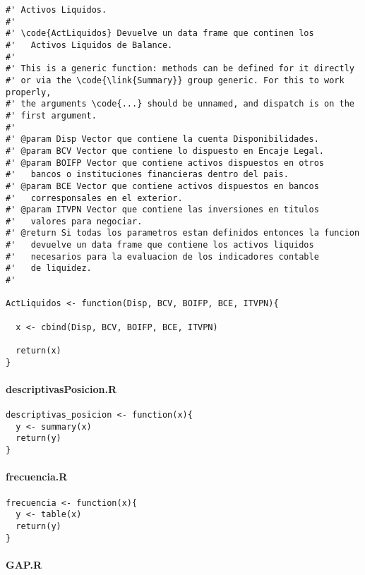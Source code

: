 \documentclass[]{article}
\begin{document}
\begin{verbatim}
#' Activos Liquidos.
#'
#' \code{ActLiquidos} Devuelve un data frame que continen los 
#'   Activos Liquidos de Balance.
#'
#' This is a generic function: methods can be defined for it directly
#' or via the \code{\link{Summary}} group generic. For this to work properly,
#' the arguments \code{...} should be unnamed, and dispatch is on the
#' first argument.
#'
#' @param Disp Vector que contiene la cuenta Disponibilidades.
#' @param BCV Vector que contiene lo dispuesto en Encaje Legal.
#' @param BOIFP Vector que contiene activos dispuestos en otros
#'   bancos o instituciones financieras dentro del pais.
#' @param BCE Vector que contiene activos dispuestos en bancos
#'   corresponsales en el exterior.
#' @param ITVPN Vector que contiene las inversiones en titulos
#'   valores para negociar.
#' @return Si todas los parametros estan definidos entonces la funcion
#'   devuelve un data frame que contiene los activos liquidos 
#'   necesarios para la evaluacion de los indicadores contable 
#'   de liquidez.
#'   

ActLiquidos <- function(Disp, BCV, BOIFP, BCE, ITVPN){
  
  x <- cbind(Disp, BCV, BOIFP, BCE, ITVPN)
  
  return(x)
}
\end{verbatim}

\hypertarget{descriptivasposicion.r}{%
\paragraph{descriptivasPosicion.R}\label{descriptivasposicion.r}}

\begin{verbatim}
descriptivas_posicion <- function(x){
  y <- summary(x)
  return(y)
}
\end{verbatim}

\hypertarget{frecuencia.r}{%
\paragraph{frecuencia.R}\label{frecuencia.r}}

\begin{verbatim}
frecuencia <- function(x){
  y <- table(x)
  return(y)
}
\end{verbatim}

\hypertarget{gap.r}{%
\paragraph{GAP.R}\label{gap.r}}
\end{document}
